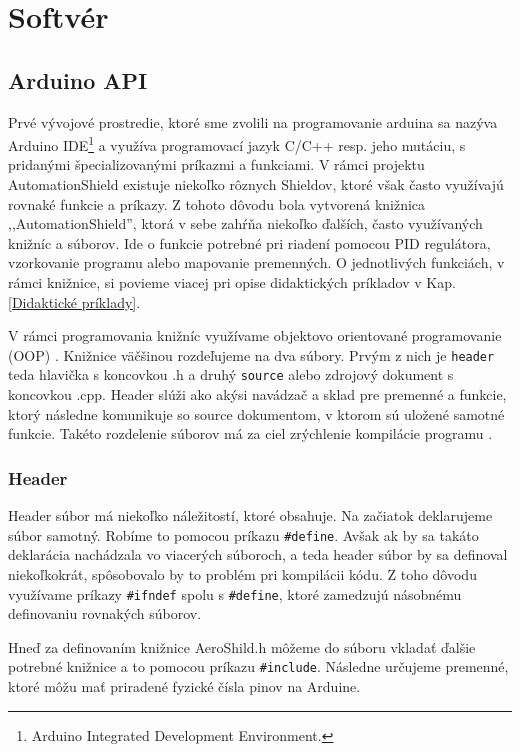 \section{Softvér}
\subsection{Arduino API}
\label{ArduinoLib}

Prvé vývojové prostredie, ktoré sme zvolili na programovanie arduina sa nazýva Arduino IDE\footnote[5]{Arduino Integrated Development Environment.} a využíva programovací jazyk C/C++ resp. jeho mutáciu, s pridanými špecializovanými príkazmi a funkciami. V rámci projektu AutomationShield existuje niekoľko rôznych Shieldov, ktoré však často využívajú rovnaké funkcie a príkazy. Z tohoto dôvodu bola vytvorená knižnica ,,AutomationShield'', ktorá v sebe zahŕňa niekoľko ďalších, často využívaných knižníc a súborov. Ide o funkcie potrebné pri riadení pomocou PID regulátora, vzorkovanie programu alebo mapovanie premenných. O jednotlivých funkciách, v rámci knižnice, si povieme viacej pri opise didaktických príkladov v Kap. \ref{Didaktické príklady}.

V rámci programovania knižníc využívame objektovo orientované programovanie \newline (OOP) \cite{oop}. Knižnice väčšinou rozdeľujeme na dva súbory. Prvým z nich je \verb|header| teda hlavička s koncovkou .h a druhý \verb|source| alebo zdrojový dokument s koncovkou .cpp. Header slúži ako akýsi navádzač a sklad pre premenné a funkcie, ktorý následne komunikuje so source dokumentom, v ktorom sú uložené samotné funkcie. Takéto rozdelenie súborov má za ciel zrýchlenie kompilácie programu \cite{546521}.


\subsubsection{Header}

Header súbor má niekoľko náležitostí, ktoré obsahuje. Na začiatok deklarujeme súbor samotný. Robíme to pomocou príkazu \verb|#define|. Avšak ak by sa takáto deklarácia nachádzala vo viacerých súboroch, a teda header súbor by sa definoval niekoľkokrát, spôsobovalo by to problém pri kompilácii kódu. Z toho dôvodu využívame príkazy \verb|#ifndef| spolu s \verb|#define|, ktoré zamedzujú násobnému definovaniu rovnakých súborov. 

Hneď za definovaním knižnice AeroShild.h môžeme do súboru vkladať ďalšie potrebné knižnice a to pomocou príkazu \verb|#include|. Následne určujeme premenné, ktoré môžu mať priradené fyzické čísla pinov na Arduine. 


